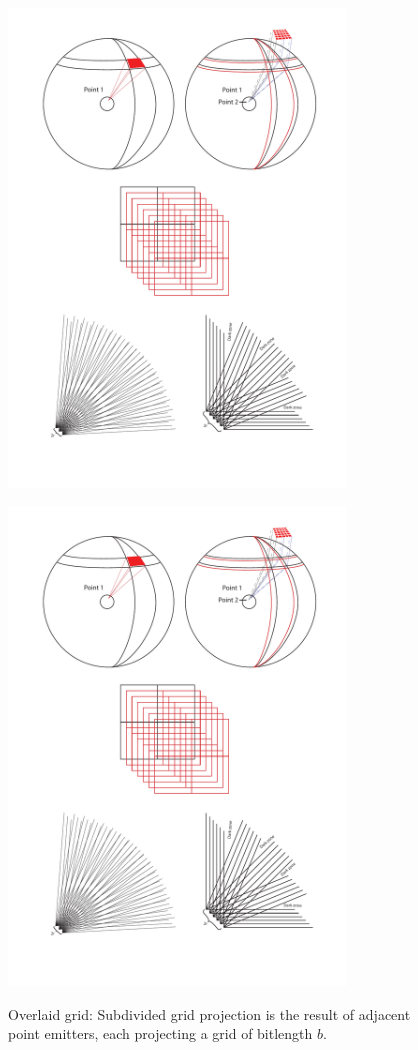 \documentclass[notitlepage]{article}
\begin{document}
\begin{figure}
\label{fig:gridOverlay1}
{\includegraphics[width=0.8\textwidth, trim={0cm 11cm 0cm 10cm},clip]{illustrations/PointEmitterToBodyEmitter.pdf}}
\caption{Overlaid grid: Subdivided grid projection is the result of adjacent point emitters, each projecting a grid of bitlength $b$.  }\label{fig:gridOverlay2}
{\includegraphics[width=0.8\textwidth, trim={0cm 2cm 0cm 18cm},clip]{illustrations/PointEmitterToBodyEmitter.pdf}}

\end{figure}
\end{document}
